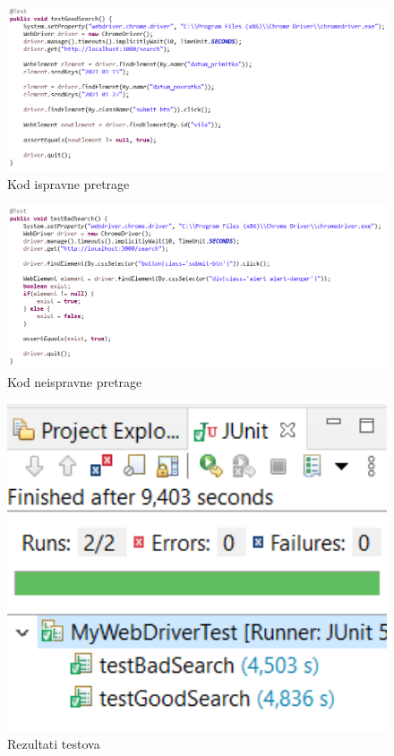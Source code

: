 \begin{flushleft}
			\begin{figure}[hp]
                    \centering
                    \includegraphics[width=15cm]{slike/koddobrapretraga.png}
                    \caption{Kod ispravne pretrage}
                    \label{fig:useCase-2}
                \end{figure}
			\eject
			
			\begin{figure}[hp]
                    \centering
                    \includegraphics[width=15cm]{slike/kodlosapretraga.png}
                    \caption{Kod neispravne pretrage}
                    \label{fig:useCase-2}
                \end{figure}
			\eject
			
			\begin{figure}[hp]
                    \centering
                    \includegraphics[width=15cm]{slike/searchtests.png}
                    \caption{Rezultati testova}
                    \label{fig:useCase-2}
                \end{figure}
			\eject
			

\end{flushleft}
